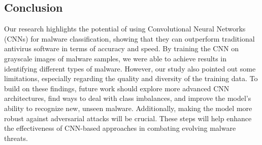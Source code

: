 \documentclass[conference]{IEEEtran}
\begin{document}
\subsection{Conclusion}
Our research highlights the potential of using Convolutional Neural Networks (CNNs) for malware classification, showing that they can outperform traditional antivirus software in terms of accuracy and speed. By training the CNN on grayscale images of malware samples, we were able to achieve results in identifying different types of malware. However, our study also pointed out some limitations, especially regarding the quality and diversity of the training data. To build on these findings, future work should explore more advanced CNN architectures, find ways to deal with class imbalances, and improve the model’s ability to recognize new, unseen malware. Additionally, making the model more robust against adversarial attacks will be crucial. These steps will help enhance the effectiveness of CNN-based approaches in combating evolving malware threats.
\end{document}
